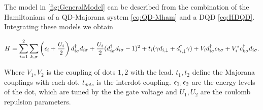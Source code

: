 










 The model in \ref{fig:GeneralModel} can be described from the combination of the Hamiltonians of a QD-Majorana system \eqref{eq:QD-Mham} and a DQD \eqref{eq:HDQD}. Integrating these models we obtain

\begin{equation}
H =\sum_{i=1}^2\sum_{k,\sigma}\left(\epsilon_{i}+\frac{U_i}{2}\right)d_{i\sigma}^{\dagger}d_{i\sigma}+ \frac{U_i}{2}(d_{i \sigma}^{\dagger}d_{i \sigma}-1)^{2} + t_i(\gamma d_{i,\downarrow}+d^\dagger_{i,\downarrow}\gamma) + V_id^\dagger_{i\sigma}c_{k\sigma}+V_i^* c^\dagger_{k\sigma}d_{i\sigma}.
\label{General model}
\end{equation}

Where $V_1,V_2$ is the coupling of dots $1,2$ with the lead. $t_1,t_2$ define the Majorana couplings with each dot. $t_{dots}$ is the interdot coupling. $\epsilon_1,\epsilon_2$ are the energy levels of the dot, which are tuned by the the gate voltage and $U_1,U_2$ are the coulomb repulsion parameters. 



